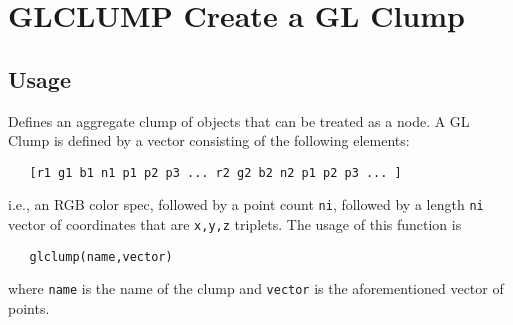 \section{GLCLUMP Create a GL Clump}

\subsection{Usage}

Defines an aggregate clump of objects that can be treated
as a node.  A GL Clump is defined by a vector consisting
of the following elements:
\begin{verbatim}
   [r1 g1 b1 n1 p1 p2 p3 ... r2 g2 b2 n2 p1 p2 p3 ... ]
\end{verbatim}
i.e., an RGB color spec, followed by a point count \verb|ni|, followed
by a length \verb|ni| vector of coordinates that are \verb|x,y,z| triplets.
The usage of this function is
\begin{verbatim}
   glclump(name,vector)
\end{verbatim}
where \verb|name| is the name of the clump and \verb|vector| is the aforementioned
vector of points.
